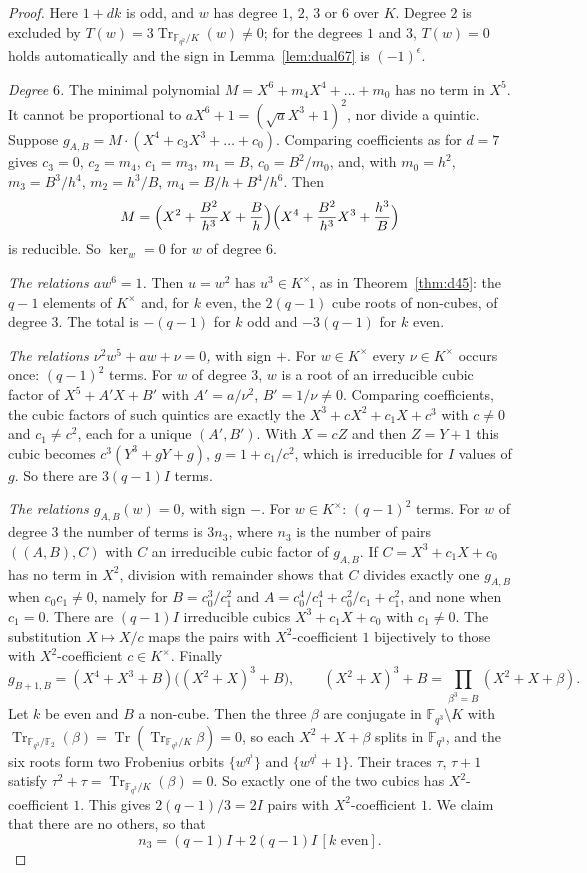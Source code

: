 \documentclass[11pt,a4paper]{amsart}
\theoremstyle{definition}
\theoremstyle{remark}
\newcommand{\F}{\mathbb{F}}
\newcommand{\Tr}{\operatorname{Tr}}
\begin{document}
\begin{proof}
Here $1+dk$ is odd, and $w$ has degree $1$, $2$, $3$ or $6$ over $K$. Degree $2$ is excluded by
$T(w)=3\Tr_{\F_{q^2}/K}(w)\ne0$; for the degrees $1$ and $3$, $T(w)=0$ holds automatically and the sign in
Lemma~\ref{lem:dual67} is $(-1)^\epsilon$.

\emph{Degree $6$.} The minimal polynomial $M=X^6+m_4X^4+\dots+m_0$ has no term in $X^5$. It cannot be proportional
to $aX^6+1=(\sqrt aX^3+1)^2$, nor divide a quintic. Suppose $g_{A,B}=M\cdot(X^4+c_3X^3+\dots+c_0)$. Comparing
coefficients as for $d=7$ gives $c_3=0$, $c_2=m_4$, $c_1=m_3$, $m_1=B$, $c_0=B^2/m_0$, and, with $m_0=h^2$,
$m_3=B^3/h^4$, $m_2=h^3/B$, $m_4=B/h+B^4/h^6$. Then
\[
M=\Bigl(X^2+\frac{B^2}{h^3}X+\frac Bh\Bigr)\Bigl(X^4+\frac{B^2}{h^3}X^3+\frac{h^3}B\Bigr)
\]
is reducible. So $\ker_w=0$ for $w$ of degree $6$.

\emph{The relations $aw^6=1$.} Then $u=w^2$ has $u^3\in K^\times$, as in Theorem~\ref{thm:d45}: the $q-1$ elements
of $K^\times$ and, for $k$ even, the $2(q-1)$ cube roots of non-cubes, of degree $3$. The total is $-(q-1)$ for
$k$ odd and $-3(q-1)$ for $k$ even.

\emph{The relations $\nu^2w^5+aw+\nu=0$,} with sign $+$. For $w\in K^\times$ every $\nu\in K^\times$ occurs once:
$(q-1)^2$ terms. For $w$ of degree $3$, $w$ is a root of an irreducible cubic factor of $X^5+A'X+B'$ with
$A'=a/\nu^2$, $B'=1/\nu\ne0$. Comparing coefficients, the cubic factors of such quintics are exactly the
$X^3+cX^2+c_1X+c^3$ with $c\ne0$ and $c_1\ne c^2$, each for a unique $(A',B')$. With $X=cZ$ and then $Z=Y+1$ this
cubic becomes $c^3(Y^3+gY+g)$, $g=1+c_1/c^2$, which is irreducible for $I$ values of $g$. So there are $3(q-1)I$
terms.

\emph{The relations $g_{A,B}(w)=0$,} with sign $-$. For $w\in K^\times$: $(q-1)^2$ terms. For $w$ of degree $3$ the
number of terms is $3n_3$, where $n_3$ is the number of pairs $((A,B),C)$ with $C$ an irreducible cubic factor of
$g_{A,B}$. If $C=X^3+c_1X+c_0$ has no term in $X^2$, division with remainder shows that $C$ divides exactly one
$g_{A,B}$ when $c_0c_1\ne0$, namely for $B=c_0^3/c_1^2$ and $A=c_0^4/c_1^4+c_0^2/c_1+c_1^2$, and none when
$c_1=0$. There are $(q-1)I$ irreducible cubics $X^3+c_1X+c_0$ with $c_1\ne0$. The substitution $X\mapsto X/c$ maps
the pairs with $X^2$-coefficient $1$ bijectively to those with $X^2$-coefficient $c\in K^\times$. Finally
\[
g_{B+1,B}=(X^4+X^3+B)\bigl((X^2+X)^3+B\bigr),\qquad (X^2+X)^3+B=\prod_{\beta^3=B}(X^2+X+\beta).
\]
Let $k$ be even and $B$ a non-cube. Then the three $\beta$ are conjugate in $\F_{q^3}\setminus K$ with
$\Tr_{\F_{q^3}/\F_2}(\beta)=\Tr(\Tr_{\F_{q^3}/K}\beta)=0$, so each $X^2+X+\beta$ splits in $\F_{q^3}$, and the six
roots form two Frobenius orbits $\{w^{q^i}\}$ and $\{w^{q^i}+1\}$. Their traces $\tau$, $\tau+1$ satisfy
$\tau^2+\tau=\Tr_{\F_{q^3}/K}(\beta)=0$. So exactly one of the two cubics has $X^2$-coefficient $1$. This gives
$2(q-1)/3=2I$ pairs with $X^2$-coefficient $1$. We claim that there are no others, so that
\[
n_3=(q-1)I+2(q-1)I\,[k\text{ even}].
\]


\end{proof}
\end{document}
